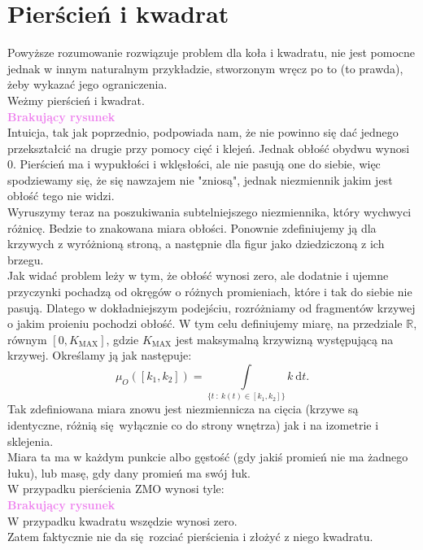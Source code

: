 \documentclass[a4paper, 12pt]{article}
\newcommand{\rysunek}[1]{\hfill \break\\[16pt] \Huge \textbf{\textcolor{violet}{Brakujący rysunek \normalsize
#1}} \hfill
\break \\[16pt] \normalsize}
\begin{document}
\section{Pierścień i kwadrat}\label{ZMO}
Powyższe rozumowanie rozwiązuje problem dla koła i kwadratu, nie jest pomocne jednak w innym naturalnym
przykładzie, stworzonym wręcz po to (to prawda), żeby wykazać jego ograniczenia. \\
Weżmy pierścień i kwadrat.
\rysunek{}
Intuicja, tak jak poprzednio, podpowiada nam, że nie powinno się dać jednego przekształcić na drugie
przy pomocy cięć i klejeń. Jednak obłość obydwu wynosi $0$.
Pierścień ma i wypukłości i wklęsłości, ale nie pasują one do siebie, więc spodziewamy się, że się nawzajem
nie "zniosą", jednak niezmiennik jakim jest obłość tego nie widzi. \\
Wyruszymy teraz na poszukiwania subtelniejszego niezmiennika, który wychwyci różnicę. Bedzie to
znakowana miara obłości. Ponownie zdefiniujemy ją dla krzywych z wyróżnioną stroną, a następnie
dla figur jako dziedziczoną z ich brzegu. \\
Jak widać problem leży w tym, że obłość wynosi zero, ale dodatnie i ujemne przyczynki pochadzą od okręgów
o różnych promieniach, które i tak do siebie nie pasują. Dlatego w dokładniejszym podejściu, rozróżniamy
od fragmentów krzywej o jakim proieniu pochodzi obłość. W tym celu definiujemy miarę, na przedziale
$\mathbb{R}$, równym $[0, K_\text{MAX}]$, gdzie $K_\text{MAX}$ jest maksymalną krzywizną występującą na
krzywej. Określamy ją jak następuje:
\begin{equation}
    \mu_O([k_1, k_2]) = \displaystyle\int\limits_{\{t\ :\ k(t) \in [k_1, k_2]\}}
    k\ \textrm{d}t.
\end{equation}
Tak zdefiniowana miara znowu jest niezmiennicza na cięcia (krzywe są identyczne, różnią się wyłącznie co do
strony wnętrza) jak i na izometrie i sklejenia. \\
Miara ta ma w każdym punkcie albo gęstość (gdy jakiś promień nie ma żadnego łuku), lub masę, gdy dany promień
 ma swój łuk. \\
 W przypadku pierścienia ZMO wynosi tyle:
 \rysunek{}
 W przypadku kwadratu wszędzie wynosi zero. \\
 Zatem faktycznie nie da się rozciać pierścienia i złożyć z niego kwadratu. \\
\end{document}
